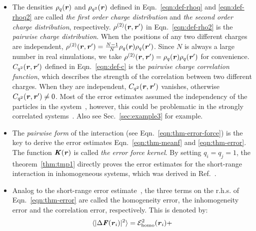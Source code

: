 \documentclass[aps,pre,preprint]{revtex4}
\renewcommand{\v}[1]{\textbf{\textit{#1}}}
\begin{document}
\begin{itemize}
\item The densities $\rho_q(\v r)$ and $\rho_{q^2}(\v r)$ defined in
  Eqn.~\eqref{eqn:def-rhoq} and \eqref{eqn:def-rhoq2} are called \emph{the
    first order charge distribution} and \emph{the
    second order charge distribution},
  respectively.
  $\rho^{(2)}(\v r, \v r')$ in Eqn.~\eqref{eqn:def-rho2}
  is the \emph{pairwise charge distribution}.
  When the positions of any two different charges are independent,
  $\rho^{(2)}(\v r, \v r') = \frac{N-1}{N}\rho_q(\v r)\rho_q(\v r')$.
  Since $N$ is always a large number in real simulations, we take
  $\rho^{(2)}(\v r, \v r') = \rho_q(\v r)\rho_q(\v r')$ for convenience.
  $C_{q^2}(\v r, \v r')$ defined in
  Eqn.~\eqref{eqn:def-c} is the \emph{pairwise charge correlation function},
  which describes the strength of the correlation between  two
  different charges. When they are independent, $C_{q^2}(\v r, \v r')$
  vanishes, otherwise $C_{q^2}(\v r, \v r') \neq 0$.
  Most of the error estimates assumed the independency of the
  particles in the system~\cite{kolafa1992cutoff, deserno1998mue2, wang2010optimizing, wang2012},
  however, this could be problematic in the strongly correlated
  systems~\cite{deserno1998mue2, wang2010optimizing}.
  Also see Sec.~\ref{sec:example3} for example.
\item
  The \emph{pairwise form}
  of the interaction (see Eqn.~\eqref{eqn:thm-error-force}) is the key to derive
  the error estimates Eqn.~\eqref{eqn:thm-meanf} and \eqref{eqn:thm-error}.
  The function $\v K(\v r)$ is called \emph{the error force
    kernel}.
  By setting $q_i = q_j = 1$, the theorem~\ref{thm:tmp1} directly proves
  the error estimates for the short-range interaction
  in inhomogeneous systems, which was derived in Ref.~\cite{wang2012}. 
\item Analog to the short-range error estimate~\cite{wang2012}, the
  three terms on the r.h.s. of Eqn.~\eqref{eqn:thm-error} are called the
  homogeneity error, the inhomogeneity error and the correlation
  error, respectively.
  This is denoted by:
  \begin{align}\label{eqn:error-split}
    \langle\vert\Delta\v F(\v r_i)\vert^2\rangle
    =
    \mathcal E^2_{\textrm{homo}}(\v r_i) +

\end{align}
\end{itemize}
\end{document}
